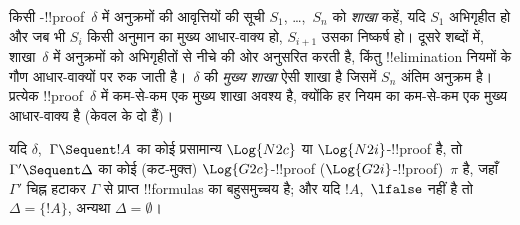 \documentclass[../../../include/open-logic-section]{subfiles}
\begin{document}
किसी -!!{proof}~$\delta$ में अनुक्रमों की आवृत्तियों की सूची $S_1$,
\dots,~$S_n$ को \emph{शाखा} कहें, यदि $S_1$ अभिगृहीत हो और जब भी $S_i$ किसी
अनुमान का मुख्य आधार-वाक्य हो, $S_{i+1}$ उसका निष्कर्ष हो। दूसरे शब्दों में,
शाखा~$\delta$ में अनुक्रमों को अभिगृहीतों से नीचे की ओर अनुसरित करती है, किंतु
!!{elimination} नियमों के गौण आधार-वाक्यों पर रुक जाती है।~$\delta$ की
\emph{मुख्य शाखा} ऐसी शाखा है जिसमें $S_n$ अंतिम अनुक्रम है। प्रत्येक
!!{proof}~$\delta$ में कम-से-कम एक मुख्य शाखा अवश्य है, क्योंकि हर नियम का
कम-से-कम एक मुख्य आधार-वाक्य है (केवल \Intro{\land} के दो हैं)।


\begin{prop} यदि $\delta$,~$\Gamma \Sequent
!A$ का कोई प्रसामान्य $\Log{N2c}$ या $\Log{N2i}$-!!{proof} है, तो $\Gamma'
\Sequent \Delta$ का कोई (कट-मुक्त) $\Log{G2c}$-!!{proof}
($\Log{G2i}$-!!{proof})~$\pi$ है, जहाँ $\Gamma'$ चिह्न हटाकर $\Gamma$ से
प्राप्त !!{formula}s का बहुसमुच्चय है; और यदि $!A$,~$\lfalse$ नहीं है तो
$\Delta = \{!A\}$, अन्यथा $\Delta = \emptyset$।
\end{prop}
\end{document}
